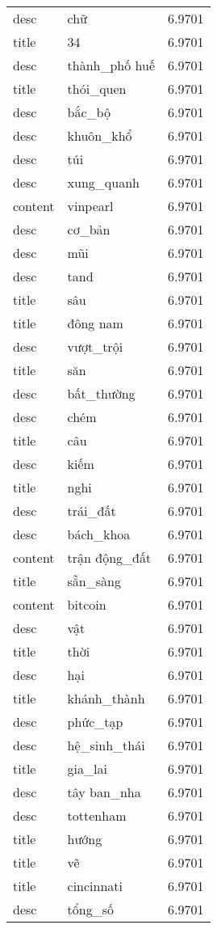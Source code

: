 \documentclass{article}
\begin{document}
\begin{tabular}{lll}
desc & chữ & 6.9701\\
title & 34 & 6.9701\\
desc & thành\_phố huế & 6.9701\\
title & thói\_quen & 6.9701\\
desc & bắc\_bộ & 6.9701\\
desc & khuôn\_khổ & 6.9701\\
desc & túi & 6.9701\\
desc & xung\_quanh & 6.9701\\
content & vinpearl & 6.9701\\
desc & cơ\_bản & 6.9701\\
desc & mũi & 6.9701\\
desc & tand & 6.9701\\
title & sâu & 6.9701\\
title & đông nam & 6.9701\\
desc & vượt\_trội & 6.9701\\
title & săn & 6.9701\\
desc & bất\_thường & 6.9701\\
desc & chém & 6.9701\\
title & câu & 6.9701\\
desc & kiếm & 6.9701\\
title & nghi & 6.9701\\
desc & trái\_đất & 6.9701\\
desc & bách\_khoa & 6.9701\\
content & trận động\_đất & 6.9701\\
title & sẵn\_sàng & 6.9701\\
content & bitcoin & 6.9701\\
desc & vật & 6.9701\\
title & thời & 6.9701\\
desc & hại & 6.9701\\
title & khánh\_thành & 6.9701\\
desc & phức\_tạp & 6.9701\\
desc & hệ\_sinh\_thái & 6.9701\\
title & gia\_lai & 6.9701\\
desc & tây ban\_nha & 6.9701\\
desc & tottenham & 6.9701\\
title & hướng & 6.9701\\
title & vẽ & 6.9701\\
title & cincinnati & 6.9701\\
desc & tổng\_số & 6.9701\\

\end{tabular}
\end{document}
